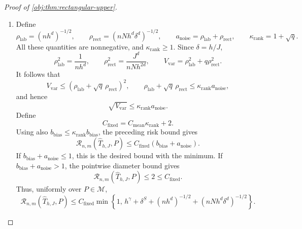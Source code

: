 \documentclass[11pt]{article}
\begin{document}
\begin{proof}[Proof of \cref{obj:thm:rectangular-upper}]
\begin{enumerate}
Define the variance scale by
\[
V_{\mathrm{var}}
=\frac1{nh^d}+\frac{qJ^d}{nNh^{2d}}.
\]
By \cref{obj:lem:rectangular-sampling-bound}, there is a uniform positive finite constant \(C_{\mathrm{samp}}\) such that
\[
\mathbb E_{\mathsf E_{n,m}(P)}Z_R
+\mathbb E_{\mathsf E_{n,m}(P)}Z_Q
\le C_{\mathrm{samp}}V_{\mathrm{var}}.
\]
Both deviations are nonnegative. Cauchy--Schwarz under the probability sampling law therefore gives
\[
\begin{aligned}
\mathbb E_{\mathsf E_{n,m}(P)}\sqrt{Z_R}
&\le
\sqrt{\mathbb E_{\mathsf E_{n,m}(P)}Z_R}
\le\sqrt{C_{\mathrm{samp}}}\sqrt{V_{\mathrm{var}}},\\
\mathbb E_{\mathsf E_{n,m}(P)}\sqrt{Z_Q}
&\le
\sqrt{\mathbb E_{\mathsf E_{n,m}(P)}Z_Q}
\le\sqrt{C_{\mathrm{samp}}}\sqrt{V_{\mathrm{var}}}.
\end{aligned}
\]
The decision and target both belong to \([-1,1]\), so their absolute difference is at most \(2\) and is integrable. Integrating the pointwise inequality and defining
\[
C_{\mathrm{mean}}
=\kappa_{\mathrm{mean}}(1+2\sqrt{C_{\mathrm{samp}}})
\]
proves
\[
\begin{aligned}
\mathcal R_{n,m}(\widehat T_{h,J},P)
&\le\kappa_{\mathrm{mean}}
 \left(b_{\mathrm{bias}}
       +2\sqrt{C_{\mathrm{samp}}}\sqrt{V_{\mathrm{var}}}\right)\\
&\le C_{\mathrm{mean}}
 (b_{\mathrm{bias}}+\sqrt{V_{\mathrm{var}}}).
\end{aligned}
\]%

\item Define
\[
\rho_{\mathrm{lab}}=(nh^d)^{-1/2},\qquad
\rho_{\mathrm{rect}}=(nNh^d\delta^d)^{-1/2},\qquad
a_{\mathrm{noise}}=\rho_{\mathrm{lab}}+\rho_{\mathrm{rect}},
\qquad
\kappa_{\mathrm{rank}}=1+\sqrt q.
\]
All these quantities are nonnegative, and
\(\kappa_{\mathrm{rank}}\ge1\). Since \(\delta=h/J\),
\[
\rho_{\mathrm{lab}}^2=\frac1{nh^d},\qquad
\rho_{\mathrm{rect}}^2
=\frac{J^d}{nNh^{2d}},\qquad
V_{\mathrm{var}}
=\rho_{\mathrm{lab}}^2+q\rho_{\mathrm{rect}}^2.
\]
It follows that
\[
V_{\mathrm{var}}
\le
(\rho_{\mathrm{lab}}+\sqrt q\,\rho_{\mathrm{rect}})^2,
\qquad
\rho_{\mathrm{lab}}+\sqrt q\,\rho_{\mathrm{rect}}
\le\kappa_{\mathrm{rank}}a_{\mathrm{noise}},
\]
and hence
\[
\sqrt{V_{\mathrm{var}}}
\le\kappa_{\mathrm{rank}}a_{\mathrm{noise}}.
\]
Define
\[
C_{\mathrm{fixed}}
=C_{\mathrm{mean}}\kappa_{\mathrm{rank}}+2.
\]
Using also
\(b_{\mathrm{bias}}\le\kappa_{\mathrm{rank}}b_{\mathrm{bias}}\), the preceding risk bound gives
\[
\mathcal R_{n,m}(\widehat T_{h,J},P)
\le C_{\mathrm{fixed}}
 (b_{\mathrm{bias}}+a_{\mathrm{noise}}).
\]
If \(b_{\mathrm{bias}}+a_{\mathrm{noise}}\le1\), this is the desired bound with the minimum. If
\(b_{\mathrm{bias}}+a_{\mathrm{noise}}>1\), the pointwise diameter bound gives
\[
\mathcal R_{n,m}(\widehat T_{h,J},P)
\le2\le C_{\mathrm{fixed}}.
\]
Thus, uniformly over \(P\in\mathcal M\),
\[
\mathcal R_{n,m}(\widehat T_{h,J},P)
\le C_{\mathrm{fixed}}
\min\left\{1,\,
h^\gamma+\delta^S+(nh^d)^{-1/2}
 +(nNh^d\delta^d)^{-1/2}\right\}.
\]%


\end{enumerate}
\end{proof}
\end{document}
